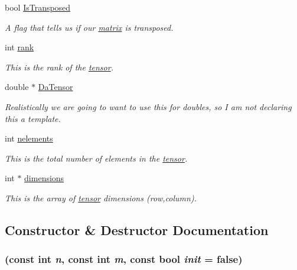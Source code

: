 \begin{DoxyCompactItemize}
\item 
bool \hyperlink{classJKBuilder_1_1matrix_a77fa48e57c519482de2ec7ec182b16ef}{IsTransposed}
\begin{DoxyCompactList}\small\item\em A flag that tells us if our \hyperlink{classJKBuilder_1_1matrix}{matrix} is transposed. \item\end{DoxyCompactList}\item 
int \hyperlink{classJKBuilder_1_1tensor_a6cfd95afd0afebd625b889fb6e58371c}{rank}
\begin{DoxyCompactList}\small\item\em This is the rank of the \hyperlink{classJKBuilder_1_1tensor}{tensor}. \item\end{DoxyCompactList}\item 
double $\ast$ \hyperlink{classJKBuilder_1_1tensor_a91f7b1e58c0e5d1a49ddb8b80ab7790e}{DaTensor}
\begin{DoxyCompactList}\small\item\em Realistically we are going to want to use this for doubles, so I am not declaring this a template. \item\end{DoxyCompactList}\item 
int \hyperlink{classJKBuilder_1_1tensor_a23ae6a00bed19d2ad34d439636e797da}{nelements}
\begin{DoxyCompactList}\small\item\em This is the total number of elements in the \hyperlink{classJKBuilder_1_1tensor}{tensor}. \item\end{DoxyCompactList}\item 
int $\ast$ \hyperlink{classJKBuilder_1_1tensor_a2ce1e6e0782ddee097f2c4aa2663d3e9}{dimensions}
\begin{DoxyCompactList}\small\item\em This is the array of \hyperlink{classJKBuilder_1_1tensor}{tensor} dimensions (row,column). \item\end{DoxyCompactList}\end{DoxyCompactItemize}


\subsection{Constructor \& Destructor Documentation}
\hypertarget{classJKBuilder_1_1SharedMatrix_af772312dbed003a511b08981c4867a86}{
\subsubsection[{SharedMatrix}]{ (const int {\em n}, \/  const int {\em m}, \/  const bool {\em init} = {\ttfamily false})}}
\label{classJKBuilder_1_1SharedMatrix_af772312dbed003a511b08981c4867a86}


